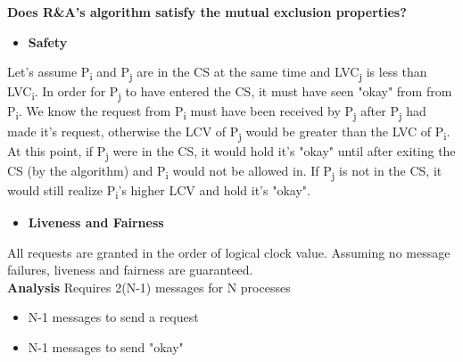 \documentclass[twoside]{article}
\begin{document}
\textbf{Does R\&A's algorithm satisfy the mutual exclusion properties?}
\begin{itemize}
    \item \textbf{Safety}
\end{itemize}
Let's assume P\textsubscript{i} and P\textsubscript{j} are in the CS at the same time and LVC\textsubscript{j} is less than
LVC\textsubscript{i}. In order for P\textsubscript{j} to have entered the CS, it must have seen "okay" from
from P\textsubscript{i}. We know the request from P\textsubscript{i} must have been received by P\textsubscript{j}
after P\textsubscript{j} had made it's request, otherwise the LCV of P\textsubscript{j} would be greater than
the LVC of P\textsubscript{i}. At this point, if P\textsubscript{j} were in the CS, it would hold it's "okay" until
after exiting the CS (by the algorithm) and P\textsubscript{i} would not be allowed in. If P\textsubscript{j} is not
in the CS, it would still realize P\textsubscript{i}'s higher LCV and hold it's "okay".
\begin{itemize}
    \item \textbf{Liveness and Fairness}
\end{itemize}
All requests are granted in the order of logical clock value. Assuming no message failures,
liveness and fairness are guaranteed. \\

\textbf{Analysis}
Requires 2(N-1) messages for N processes
\begin{itemize}
    \item N-1 messages to send a request
    \item N-1 messages to send "okay"
\end{itemize}
\end{document}
